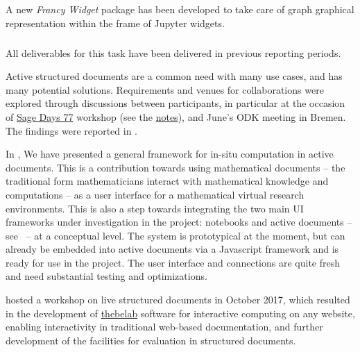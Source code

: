 A new \emph{Francy Widget} package has been developed to take care of graph graphical representation
within the frame of Jupyter widgets.



\subparagraph{}
\label{UI@structdocs}

All deliverables for this task have been delivered in previous reporting periods.


Active structured documents are a common need with many use cases, and has many potential solutions.
Requirements and venues for collaborations were explored through discussions between participants,
in particular at the occasion of \href{https://wiki.sagemath.org/days77/}{Sage Days 77} workshop
(see the \href{https://wiki.sagemath.org/days77/live-structured-documents}{notes}), and June's ODK
meeting in Bremen. The findings were reported in .

In , We have presented a general framework for in-situ computation in active documents. This is
a contribution towards using mathematical documents -- the traditional form mathematicians
interact with mathematical knowledge and computations -- as a user interface for a
mathematical virtual research environments. This is also a step towards integrating the
two main UI frameworks under investigation in the \ODK project: \Jupyter notebooks and
active documents -- see~ -- at a conceptual level. The system is
prototypical at the moment, but can already be embedded into active documents via a
Javascript framework and is ready for use in the \ODK project. The user interface and \SCSCP
connections are quite fresh and need substantial testing and optimizations.

\ODK hosted a workshop on live structured documents in October 2017,
which resulted in the development of \href{https://github.com/minrk/thebelab}{thebelab} software for interactive computing on any website,
enabling interactivity in traditional web-based documentation,
and further development of the \MathHub facilities for evaluation in structured documents.

